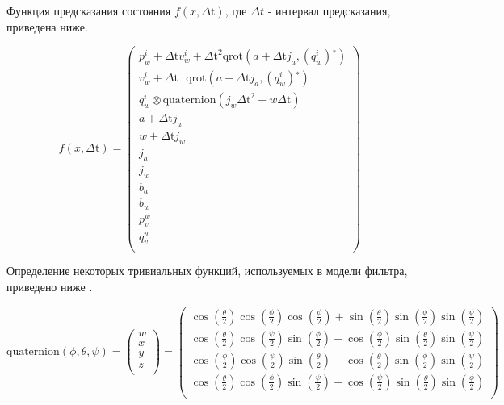 \documentclass[12pt,a4paper]{article}
\begin{document}
Функция предсказания состояния $f(x,\text{$\Delta $t})$, где $\Delta t$ - интервал предсказания, приведена ниже.

\begin{equation}
    \label{eq:f}
    f(x,\text{$\Delta $t})=\left(
    \begin{array}{c}
    p_w^i+\text{$\Delta $t} v_w^i+\text{$\Delta $t}^2 \text{qrot}\left(a+\text{$\Delta $t} j_a,\left(q_w^i\right){}^*\right) \\
    v_w^i+\text{$\Delta $t} \text{ } \text{qrot}\left(a+\text{$\Delta $t} j_a,\left(q_w^i\right){}^*\right) \\
    q_w^i\otimes \text{quaternion}\left(j_w \text{$\Delta $t}^2+w \text{$\Delta $t}\right) \\
    a+\text{$\Delta $t} j_a \\
    w+\text{$\Delta $t} j_w \\
    j_a \\
    j_w \\
    b_a \\
    b_w \\
    p_v^w \\
    q_v^w \\
    \end{array}
    \right)
\end{equation}

Определение некоторых тривиальных функций, используемых в модели фильтра, приведено ниже \cite{QuaternionsMadgwick, QuaternionsNASA}.

\begin{equation}
    \label{eq:quaternion}
    \text{quaternion}(\phi ,\theta ,\psi )=\left(
    \begin{array}{c}
    w \\
    x \\
    y \\
    z \\
    \end{array}
    \right)=\left(
    \begin{array}{c}
    \cos \left(\frac{\theta }{2}\right) \cos \left(\frac{\phi }{2}\right) \cos \left(\frac{\psi }{2}\right)+\sin \left(\frac{\theta }{2}\right) \sin \left(\frac{\phi }{2}\right) \sin \left(\frac{\psi }{2}\right) \\
    \cos \left(\frac{\theta }{2}\right) \cos \left(\frac{\psi }{2}\right) \sin \left(\frac{\phi }{2}\right)-\cos \left(\frac{\phi }{2}\right) \sin \left(\frac{\theta }{2}\right) \sin \left(\frac{\psi }{2}\right) \\
    \cos \left(\frac{\phi }{2}\right) \cos \left(\frac{\psi }{2}\right) \sin \left(\frac{\theta }{2}\right)+\cos \left(\frac{\theta }{2}\right) \sin \left(\frac{\phi }{2}\right) \sin \left(\frac{\psi }{2}\right) \\
    \cos \left(\frac{\theta }{2}\right) \cos \left(\frac{\phi }{2}\right) \sin \left(\frac{\psi }{2}\right)-\cos \left(\frac{\psi }{2}\right) \sin \left(\frac{\theta }{2}\right) \sin \left(\frac{\phi }{2}\right) \\
    \end{array}
    \right)
\end{equation}
\end{document}
